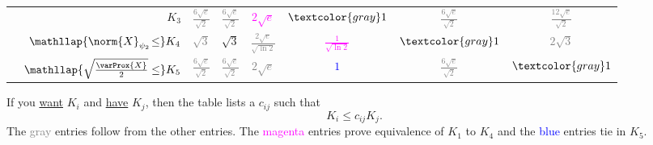 \begin{mdframed}[innertopmargin=0pt]
\begin{theorem}
\begin{center}
{\begin{tabular}{r r | c c c c c c}
            & \(K_3\)
            & \textcolor{gray}{\(\frac{6\sqrt{e}}{\sqrt{2}}\)}
            & \textcolor{gray}{\(\frac{6\sqrt{e}}{\sqrt{2}}\)}
            & \textcolor{magenta}{\(2\sqrt{e}\)}
            & \(\textcolor{gray}1\)
            & \textcolor{gray}{\(\frac{6\sqrt{e}}{\sqrt{2}}\)}
            & \textcolor{gray}{\(\frac{12\sqrt{e}}{\sqrt{2}}\)}
            \\
            & \(\mathllap{\norm{X}_{\psi_2}\! \le}K_4\)
            & \textcolor{gray}{\(\sqrt{3}\)}
            &\(\sqrt{3}\)
            & \textcolor{gray}{\(\frac{2\sqrt{e}}{\sqrt{\ln 2}}\)}
            & \textcolor{magenta}{\(\frac1{\sqrt{\ln 2}}\)}
            & \(\textcolor{gray}1\)
            & \textcolor{gray}{\(2\sqrt{3}\)}
            \\
            & \(\mathllap{\sqrt{\frac{\varProx{X}}2} \le} K_5\)
            & \textcolor{gray}{\(\frac{6\sqrt{e}}{\sqrt{2}}\)}
            & \textcolor{gray}{\(\frac{6\sqrt{e}}{\sqrt{2}}\)}
            & \textcolor{gray}{\(2\sqrt{e}\)}
            & \textcolor{blue}{\(1\)}
            & \textcolor{gray}{\(\frac{6\sqrt{e}}{\sqrt{2}}\)}
            & \(\textcolor{gray}1\)
        \end{tabular}
        \hspace{0.1em}
        \begin{minipage}{0.32\textwidth}
        If you \underline{want} \(K_i\) and \underline{have}
        \(K_j\), then the table lists a \(c_{ij}\) such that
        \[
            K_i \le c_{ij} K_j.
        \]
        The \textcolor{gray}{gray} entries follow from the other entries. The \textcolor{magenta}{magenta}
        entries prove equivalence of \(K_1\) to \(K_4\) and the
        \textcolor{blue}{blue} entries tie in \(K_5\).
        \end{minipage}
        }
    \end{center}
\end{theorem}
\end{mdframed}

